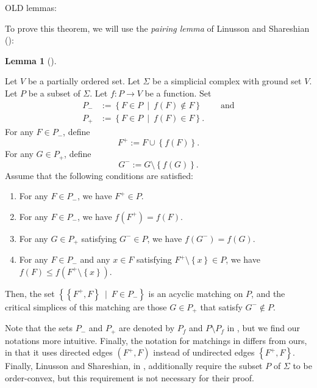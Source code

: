 \documentclass[numbers=enddot,12pt,final,onecolumn,notitlepage]{scrartcl}%
\theoremstyle{definition}
\newtheorem{lem}[theo]{Lemma}
\newenvironment{lemma}[1][]
{\begin{lem}[#1]\begin{leftbar}}
{\end{leftbar}\end{lem}}
\newenvironment{noncompile}{}{}
\begin{document}
\begin{noncompile}
OLD lemmas:

To prove this theorem, we will use the \emph{pairing lemma} of Linusson and
Shareshian (\cite[Lemma 3.4]{LinSha03}):

\begin{lemma}
\label{lem.pairing}Let $V$ be a partially ordered set. Let $\Sigma$ be a
simplicial complex with ground set $V$. Let $P$ be a subset of $\Sigma$. Let
$f:P\rightarrow V$ be a function. Set%
\begin{align*}
P_{-}  &  :=\left\{  F\in P\ \mid\ f\left(  F\right)  \notin F\right\}
\ \ \ \ \ \ \ \ \ \ \text{and}\\
P_{+}  &  :=\left\{  F\in P\ \mid\ f\left(  F\right)  \in F\right\}  .
\end{align*}
For any $F\in P_{-}$, define
\[
F^{+}:=F\cup\left\{  f\left(  F\right)  \right\}  .
\]
For any $G\in P_{+}$, define%
\[
G^{-}:=G\setminus\left\{  f\left(  G\right)  \right\}  .
\]
Assume that the following conditions are satisfied:

\begin{enumerate}
\item[\textbf{(A)}] For any $F\in P_{-}$, we have $F^{+}\in P$.

\item[\textbf{(B)}] For any $F\in P_{-}$, we have $f\left(  F^{+}\right)
=f\left(  F\right)  $.

\item[\textbf{(C)}] For any $G\in P_{+}$ satisfying $G^{-}\in P$, we have
$f\left(  G^{-}\right)  =f\left(  G\right)  $.

\item[\textbf{(D)}] For any $F\in P_{-}$ and any $x\in F$ satisfying
$F^{+}\setminus\left\{  x\right\}  \in P$, we have $f\left(  F\right)  \leq
f\left(  F^{+}\setminus\left\{  x\right\}  \right)  $.
\end{enumerate}

Then, the set $\left\{  \left\{  F^{+},F\right\}  \ \mid\ F\in P_{-}\right\}
$ is an acyclic matching on $P$, and the critical simplices of this matching
are those $G\in P_{+}$ that satisfy $G^{-}\notin P$.
\end{lemma}

Note that the sets $P_{-}$ and $P_{+}$ are denoted by $P_{f}$ and $P\setminus
P_{f}$ in \cite[Lemma 3.4]{LinSha03}, but we find our notations more
intuitive. Finally, the notation for matchings in \cite[Lemma 3.4]{LinSha03}
differs from ours, in that it uses directed edges $\left(  F^{+},F\right)  $
instead of undirected edges $\left\{  F^{+},F\right\}  $. Finally, Linusson
and Shareshian, in \cite[Lemma 3.4]{LinSha03}, additionally require the subset
$P$ of $\Sigma$ to be order-convex, but this requirement is not necessary for
their proof.


\end{noncompile}
\end{document}

